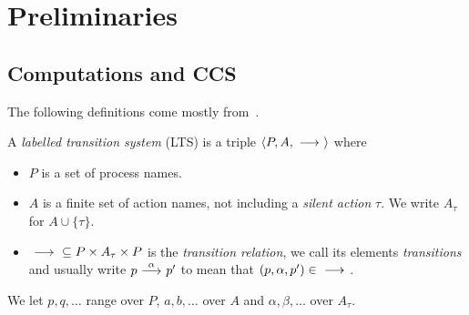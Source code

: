 \section{Preliminaries}\label{sec:preliminaries}
\subsection{Computations and CCS} %
The following definitions come mostly from~\cite{DeNicola:1990}.

\begin{definition}
    A \emph{labelled transition system} (LTS)
    is a triple $\langle P,A,\ {\stackrel{{}}{\longrightarrow}}\ \rangle$ where
    \begin{itemize}
        \item $P$ is a set of process names.
        \item $A$ is a finite set of action names, not including a \emph{silent action}
              $\tau$. We write $A_\tau$ for $A\cup \{\tau\}$.
        \item $\ {\stackrel{{}}{\longrightarrow}}\ \subseteq P\times A_\tau \times P$ is the \emph{transition
              relation}, we call its elements \emph{transitions} and
              usually write $p\ {\stackrel{{\alpha}}{\longrightarrow}}\ p'$ to mean that $(p,\alpha,p')\in\ {\stackrel{{}}{\longrightarrow}}\ $.
    \end{itemize}
    We let $p,q,\dots$ range over $P$, $a,b,\dots$ over $A$ and $\alpha,\beta,\dots$
    over $A_\tau$.
\end{definition}

